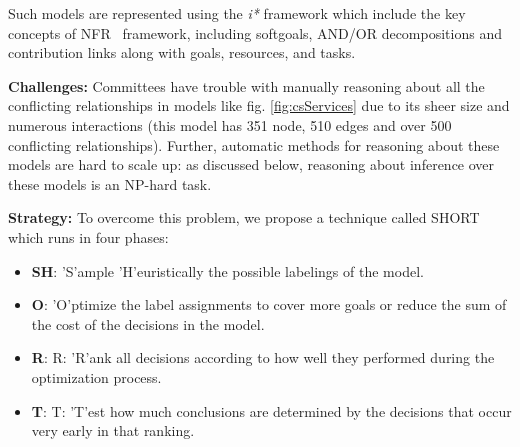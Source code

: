 \documentclass[sigconf,anonymous,review]{acmart}
\begin{document}
Such models are represented using the \textit{i*} framework \cite{yu97a} which include the key concepts of NFR~\cite{mylopoulos92.nfr} framework, including softgoals, AND/OR decompositions and contribution links along with goals, resources, and tasks. 


\noindent\textbf{Challenges: } Committees have trouble with manually reasoning about all the conflicting relationships in models like fig. \ref{fig:csServices} due to its sheer size and numerous interactions (this model has 351 node, 510 edges and over 500 conflicting relationships). Further, automatic methods for reasoning about these models are hard to scale up: as discussed below, reasoning about inference over these models is an NP-hard task. 

\noindent\textbf{Strategy:} To overcome this problem, we propose a technique called SHORT which runs in four phases:
\begin{itemize}
    \item{\textbf{SH}: 'S'ample 'H'euristically the possible labelings of the model.}
    \item{\textbf{O}: 'O'ptimize the label assignments to cover more goals or reduce the sum of the cost of the decisions in the model.}
    \item{\textbf{R}: R: 'R'ank all decisions according to how well they performed during the optimization process.}
    \item{\textbf{T}: T: 'T'est how much conclusions are determined by the decisions that occur very early in that ranking.}
\end{itemize}
\end{document}
